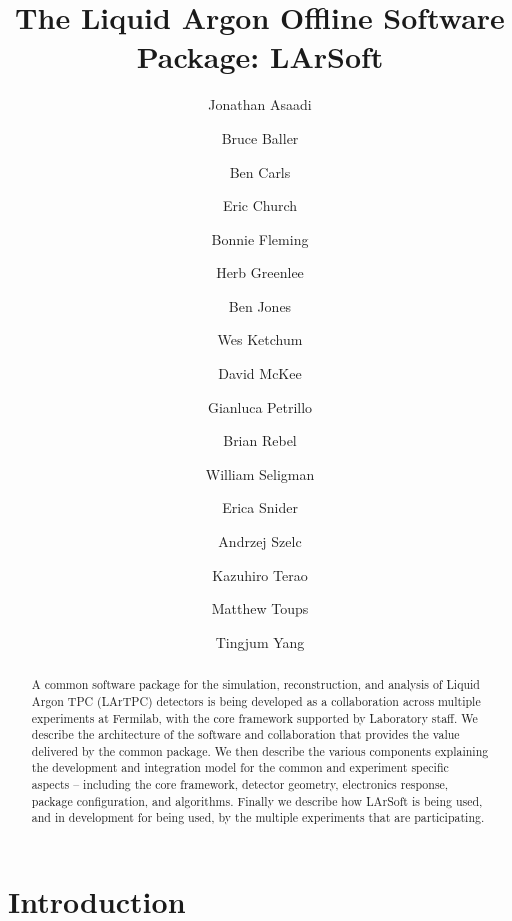 \documentclass[12pt]{elsarticle}
\begin{document}
\title{The Liquid Argon Offline Software Package: LArSoft} 
\author{Jonathan Asaadi}
\address{}
\ead{}
\author{Bruce Baller}
\address{}
\ead{}
\author{Ben Carls}
\address{}
\ead{}

\author{Eric Church}
\address{Yale University, PO Box 500, MS309, Fermi National Accelerator Lab, Batavia, IL, USA, 60510-5011}
\author{Bonnie Fleming}
\address{Yale University, PO Box XYZ, Physics Department, Yale University, New Haven, CT, USA, 12345-1234}
\author{Herb Greenlee}
\address{}
\ead{}
\author{Ben Jones}
\address{}
\ead{}
\author{Wes Ketchum}
\address{}
\ead{}
\author{David McKee}
\address{}
\ead{}

\author{Gianluca Petrillo}
\address{}
\ead{}
\author{Brian Rebel}
\address{PO Box XYZ, MS309, Fermi National Accelerator Lab, Batavia, IL, USA, 60510-5011}
\author{William Seligman}
\address{}
\ead{}
\author{Erica Snider}
\address{}
\ead{}

\author{Andrzej Szelc}
\address{}
\ead{}

\author{Kazuhiro Terao}
\address{}
\ead{}
\author{Matthew Toups}
\address{}
\ead{}
\author{Tingjum Yang}
\address{}
\ead{}
\begin{abstract}
A common software package for the simulation, reconstruction, and analysis of Liquid Argon TPC (LArTPC) detectors is being developed as a collaboration across multiple experiments at Fermilab, with the core framework supported by Laboratory staff. We describe the architecture of the software and collaboration that provides the value delivered by the common package. We then describe the various components explaining the development and integration model for the common and experiment specific aspects – including the core framework, detector geometry, electronics response, package configuration, and algorithms. Finally we describe how LArSoft is being used, and in development for being used, by the multiple experiments that are participating.

\end{abstract}
\tableofcontents

\maketitle

\section{Introduction}
\end{document}

